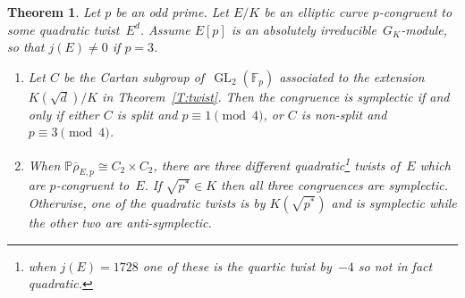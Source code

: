 \documentclass[12pt, reqno]{amsart}
\newcommand{\Fp}{\mathbb{F}_p}
\newcommand{\PP}{\mathbb{P}}
\newcommand{\rhobar}{{\overline{\rho}}}
\newcommand{\GL}{\operatorname{GL}}
\numberwithin{equation}{section}
\newtheorem{theorem}{Theorem}[section]
\theoremstyle{definition}
\theoremstyle{remark}
\begin{document}
\begin{theorem}\label{T:quadratic} 
Let $p$ be an odd prime. 
Let $E/K$ be an elliptic curve 
$p$-congruent to some quadratic twist~$E^d$.
Assume $E[p]$ is an absolutely irreducible~$G_K$-module, so that $j(E) \neq 0$ if $p=3$.

\begin{enumerate}

\item Let $C$ be the Cartan subgroup of~$\GL_2(\Fp)$
  associated to the extension $K(\sqrt{d})/K$ in
  Theorem~\ref{T:twist}.  Then the congruence is symplectic if and
  only if \emph{either} $C$ is split and $p \equiv 1 \pmod{4}$,
  \emph{or} $C$ is non-split and $p \equiv 3 \pmod{4}$.

\item When $\PP\rhobar_{E,p}\cong C_2\times C_2$, there are three
  different quadratic\footnote{when $j(E)=1728$ one of these
    is the quartic twist by~$-4$ so not in fact quadratic.}  twists
    of~$E$ which are $p$-congruent to~$E$.  If $\sqrt{p^*}\in K$ then
    all three congruences are symplectic.  Otherwise, one of the
    quadratic twists is by $K(\sqrt{p^*})$ and is symplectic while the
    other two are anti-symplectic.
\end{enumerate}
\end{theorem}
\end{document}

